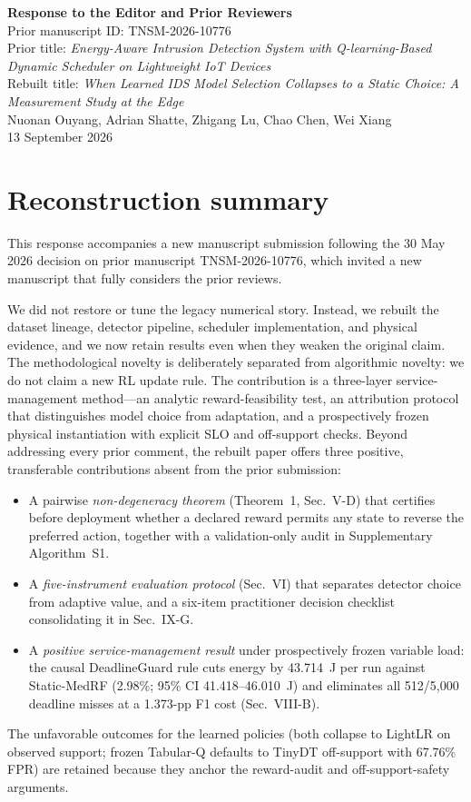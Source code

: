\documentclass[11pt]{article}
\begin{document}
\begin{center}
\textbf{\large Response to the Editor and Prior Reviewers}\\
\vspace{2pt}
Prior manuscript ID: TNSM-2026-10776\\
Prior title: \emph{Energy-Aware Intrusion Detection System with Q-learning-Based Dynamic Scheduler on Lightweight IoT Devices}\\
Rebuilt title: \emph{When Learned IDS Model Selection Collapses to a Static Choice: A Measurement Study at the Edge}\\
\vspace{4pt}
Nuonan Ouyang, Adrian Shatte, Zhigang Lu, Chao Chen, Wei Xiang\\
13 September 2026
\end{center}

\vspace{4pt}
\section*{Reconstruction summary}
This response accompanies a new manuscript submission following the 30 May 2026 decision on prior manuscript TNSM-2026-10776, which invited a new manuscript that fully considers the prior reviews.

We did not restore or tune the legacy numerical story. Instead, we rebuilt the dataset lineage, detector pipeline, scheduler implementation, and physical evidence, and we now retain results even when they weaken the original claim. The methodological novelty is deliberately separated from algorithmic novelty: we do not claim a new RL update rule. The contribution is a three-layer service-management method---an analytic reward-feasibility test, an attribution protocol that distinguishes model choice from adaptation, and a prospectively frozen physical instantiation with explicit SLO and off-support checks. Beyond addressing every prior comment, the rebuilt paper offers three positive, transferable contributions absent from the prior submission:
\begin{itemize}
    \item A pairwise \emph{non-degeneracy theorem} (Theorem~1, Sec.~V-D) that certifies before deployment whether a declared reward permits any state to reverse the preferred action, together with a validation-only audit in Supplementary Algorithm~S1.
    \item A \emph{five-instrument evaluation protocol} (Sec.~VI) that separates detector choice from adaptive value, and a six-item practitioner decision checklist consolidating it in Sec.~IX-G.
    \item A \emph{positive service-management result} under prospectively frozen variable load: the causal DeadlineGuard rule cuts energy by 43.714~J per run against Static-MedRF (2.98\%; 95\% CI 41.418--46.010~J) and eliminates all 512/5{,}000 deadline misses at a 1.373-pp F1 cost (Sec.~VIII-B).
\end{itemize}
The unfavorable outcomes for the learned policies (both collapse to LightLR on observed support; frozen Tabular-Q defaults to TinyDT off-support with 67.76\% FPR) are retained because they anchor the reward-audit and off-support-safety arguments.
\end{document}
